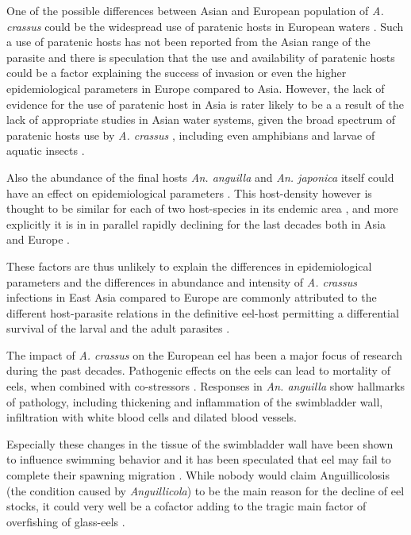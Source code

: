 One of the possible differences between Asian and European population
of \textit{A. crassus} could be the widespread use of paratenic hosts
in European waters \cite{thomas_paratenic_1992,
  pietrock_dynamics_2002}. Such a use of paratenic hosts has not been
reported from the Asian range of the parasite and there is speculation
that the use and availability of paratenic hosts could be a factor
explaining the success of invasion or even the higher epidemiological
parameters in Europe compared to Asia. However, the lack of evidence
for the use of paratenic host in Asia is rater likely to be a a result
of the lack of appropriate studies in Asian water systems, given the
broad spectrum of paratenic hosts use by \textit{A. crassus}
\cite{pietrock_dynamics_2002,rolbiecki_acndab_2004,szkely_dynamics_1995},
including even amphibians and larvae of aquatic insects
\cite{moravec_amphibians_1998}.

Also the abundance of the final hosts \textit{An. anguilla} and
\textit{An. japonica} itself could have an effect on epidemiological
parameters \cite{schabuss_dynamics_2005}. This host-density however is
thought to be similar for each of two host-species in its endemic area
\cite{tesch1983aal}, and more explicitly it is in in parallel rapidly
declining for the last decades both in Asia and Europe
\cite{pmid12713741}.

These factors are thus unlikely to explain the differences in
epidemiological parameters and the differences in abundance and
intensity of \textit{A. crassus} infections in East Asia compared to
Europe are commonly attributed to the different host-parasite
relations in the definitive eel-host permitting a differential
survival of the larval and the adult parasites
\cite{knopf_differences_2004, knopf_swimbladder_2006}.

The impact of \textit{A. crassus} on the European eel has been a major
focus of research during the past decades. Pathogenic effects on the
eels can lead to mortality of eels, when combined with co-stressors
\cite{gollock_physiological_2005}. Responses in \textit{An. anguilla}
show hallmarks of pathology, including thickening
\cite{wurtz_tara_2000} and inflammation
\cite{beregi_radiodiagnostic_1998} of the swimbladder wall,
infiltration with white blood cells and dilated blood vessels.

Especially these changes in the tissue of the swimbladder wall have
been shown to influence swimming behavior and it has been speculated
that eel may fail to complete their spawning migration
\cite{palstra_swimming_2007}. While nobody would claim Anguillicolosis
(the condition caused by \textit{Anguillicola}) to be the main reason
for the decline of eel stocks, it could very well be a cofactor
\cite{sures_science_letter} adding to the tragic main factor of
overfishing of glass-eels \cite{pmid12713741}.

